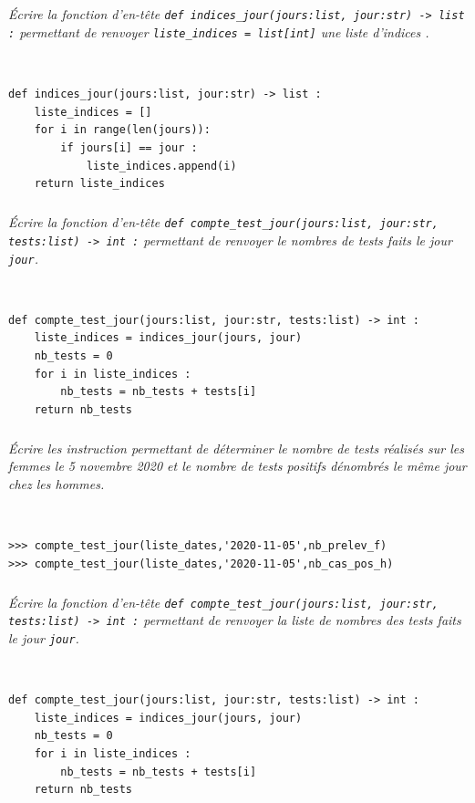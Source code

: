 \documentclass[10pt,fleqn]{article} %
\begin{document}
\subparagraph{}
\textit{Écrire la fonction d’en-tête \texttt{def indices\_jour(jours:list, jour:str) -> list :} permettant de renvoyer  \texttt{liste\_indices = list[int]} une liste d'indices .}
\ifprof
\begin{corrige}~\\
\begin{lstlisting}
def indices_jour(jours:list, jour:str) -> list :
    liste_indices = []
    for i in range(len(jours)):
        if jours[i] == jour :
            liste_indices.append(i)
    return liste_indices
\end{lstlisting}
\end{corrige}
\else
\fi

\subparagraph{}
\textit{Écrire la fonction d’en-tête \texttt{def compte\_test\_jour(jours:list, jour:str, tests:list) -> int :} permettant de renvoyer le nombres de tests faits le jour \texttt{jour}.}
\ifprof
\begin{corrige}~\\
\begin{lstlisting}
def compte_test_jour(jours:list, jour:str, tests:list) -> int :
    liste_indices = indices_jour(jours, jour)
    nb_tests = 0
    for i in liste_indices : 
        nb_tests = nb_tests + tests[i]
    return nb_tests
\end{lstlisting}
\end{corrige}
\else
\fi


\subparagraph{}
\textit{Écrire les instruction permettant de déterminer le nombre de tests réalisés sur les femmes le 5 novembre 2020 et le nombre de tests positifs dénombrés le même jour chez les hommes.}
\ifprof
\begin{corrige}~\\
\begin{lstlisting}
>>> compte_test_jour(liste_dates,'2020-11-05',nb_prelev_f)
>>> compte_test_jour(liste_dates,'2020-11-05',nb_cas_pos_h)
\end{lstlisting}
\end{corrige}
\else
\fi


\subparagraph{}
\textit{Écrire la fonction d’en-tête \texttt{def compte\_test\_jour(jours:list, jour:str, tests:list) -> int :} permettant de renvoyer la liste de nombres des tests faits le jour \texttt{jour}.}
\ifprof
\begin{corrige}~\\
\begin{lstlisting}
def compte_test_jour(jours:list, jour:str, tests:list) -> int :
    liste_indices = indices_jour(jours, jour)
    nb_tests = 0
    for i in liste_indices : 
        nb_tests = nb_tests + tests[i]
    return nb_tests
\end{lstlisting}
\end{corrige}
\else
\fi
\end{document}
